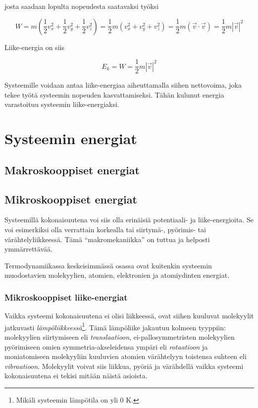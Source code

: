 \documentclass[12pt,a4paper,finnish]{book}
\begin{document}
josta saadaan lopulta nopeudesta saatavaksi työksi

\begin{equation}
 W = m \left(\frac{1}{2}v_x^2 + \frac{1}{2}v_y^2 + \frac{1}{2}v_z^2\right)
 = \frac{1}{2}m \left(v_x^2 + v_y^2 + v_z^2\right)
 = \frac{1}{2}m (\vec{v} \cdot \vec{v})
 = \frac{1}{2}m|\vec{v}|^2
\end{equation}

Liike-energia on siis

\begin{equation}
 E_k = W = \frac{1}{2}m|\vec{v}|^2
\end{equation}

Systeemille voidaan antaa liike-energiaa aiheuttamalla siihen nettovoima, joka tekee työtä systeemin 
nopeuden kasvattamiseksi. Tähän kulunut energia varastoituu systeemin liike-energiaksi.


\chapter{Systeemin energiat} %

\section{Makroskooppiset energiat} %

\section{Mikroskooppiset energiat} %

Systeemillä kokonaisuutena voi siis olla erinäisiä potentiaali- ja liike-energioita. Se voi esimerkiksi olla verrattain korkealla 
tai siirtymä-, pyörimis- tai värähtelyliikkeessä. Tämä ``makromekaniikka'' on tuttua ja helposti ymmärrettävää.

Termodynamiikassa keskeisimmässä osassa ovat kuitenkin systeemin muodostavien molekyylien, atomien, elektronien ja atomiydinten 
energiat.

\subsection{Mikroskooppiset liike-energiat}

Vaikka systeemi kokonaisuutena ei olisi liikkeessä, ovat siihen kuuluvat molekyylit jatkuvasti 
\textit{lämpöliikkeessä}\footnote{Mikäli systeemin lämpötila on yli 0 K.}. Tämä lämpöliike jakautuu kolmeen tyyppiin: molekyylien 
siirtymiseen eli \textit{translaatioon}, ei-pallosymmetristen molekyylien pyörimiseen omien symmetria-akseleidensa ympäri eli 
\textit{rotaatioon} ja moniatomiseen molekyyliin kuuluvien atomien värähtelyyn toistensa suhteen eli \textit{vibraatioon}. 
Molekyylit voivat siis liikkua, pyöriä ja värähdellä vaikka systeemi kokonaisuutena ei tekisi mitään näistä asioista.
\end{document}
